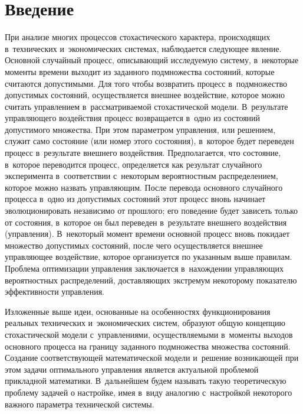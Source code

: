 

 
\vspace*{-6pt}



\thispagestyle{headings}

\begin{multicols}{2}

\label{st\stat}

\section{Введение}


При анализе многих процессов стохастического характера, происходящих 
в~технических и~экономических системах, наблюдается следующее явление. Основной 
случайный процесс, описывающий исследуемую систему, в~некоторые моменты времени 
выходит из заданного подмножества состояний, которые считаются допустимыми. Для 
того чтобы возвратить процесс в~подмножество допустимых состояний, 
осуществляется внешнее воздействие, которое можно считать управлением 
в~рассматриваемой стохастической модели. В~результате управ\-ля\-юще\-го воздействия 
процесс возвращается в~одно из состояний допустимого множества. При этом 
параметром управления, или решением, служит само состояние (или номер этого 
состояния), в~которое будет переведен процесс в~результате внешнего воздействия.
Предполагается, что состояние, в~которое переводится процесс, определяется как 
результат случайного эксперимента в~соответствии с~некоторым вероятностным 
распределением, которое можно назвать управляющим.
После перевода основного случайного процесса в~одно из допустимых состояний этот 
процесс вновь начинает эволюционировать независимо от прошлого; его поведение 
будет зависеть только от состояния, в~которое он был переведен в~результате 
внешнего воздействия (управления). В~некоторый момент времени основной процесс 
вновь покидает множество допустимых состояний, после чего осуществляется внешнее 
управляющее воздействие, которое организуется по указанным выше правилам. 
Проблема оптимизации управления заключается в~нахождении управляющих 
вероятностных распределений, доставляющих экстремум некоторому показателю 
эффективности управления.

Изложенные выше идеи, основанные на особенностях функционирования реальных 
технических и~экономических систем, образуют общую концепцию стохастической 
модели с~управлениями, осуществляемыми в~моменты выходов основного процесса на 
границу заданного подмножества множества состояний. Создание соответствующей 
математической модели и~решение возникающей при этом задачи оптимального 
управления является актуальной проблемой прикладной математики. В~дальнейшем 
будем называть такую теоретическую проблему задачей о настройке, имея в~виду 
аналогию с~настройкой некоторого важного параметра технической системы.


\end{multicols}

